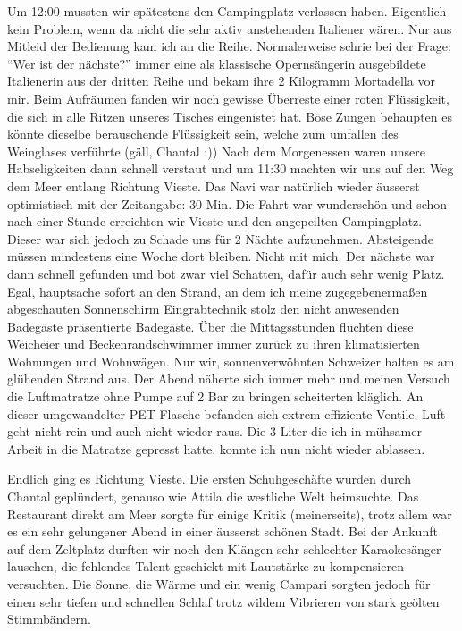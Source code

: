 Um 12:00 mussten wir spätestens den Campingplatz verlassen haben.
Eigentlich kein Problem, wenn da nicht die sehr aktiv anstehenden Italiener wären.
Nur aus Mitleid der Bedienung kam ich an die Reihe.
Normalerweise schrie bei der Frage: "`Wer ist der nächste?"' immer eine als klassische Opernsängerin ausgebildete Italienerin aus der dritten Reihe und bekam ihre 2 Kilogramm Mortadella vor mir.
Beim Aufräumen fanden wir noch gewisse Überreste einer roten Flüssigkeit, die sich in alle Ritzen unseres Tisches eingenistet hat.
Böse Zungen behaupten es könnte dieselbe berauschende Flüssigkeit sein, welche zum umfallen des Weinglases verführte (gäll, Chantal :)) Nach dem Morgenessen waren unsere Habseligkeiten dann schnell verstaut und um 11:30 machten wir uns auf den Weg dem Meer entlang Richtung Vieste.
Das Navi war natürlich wieder äusserst optimistisch mit der Zeitangabe: 30 Min.
Die Fahrt war wunderschön und schon nach einer Stunde erreichten wir Vieste und den angepeilten Campingplatz.
Dieser war sich jedoch zu Schade uns für 2 Nächte aufzunehmen.
Absteigende müssen mindestens eine Woche dort bleiben.
Nicht mit mich.
Der nächste war dann schnell gefunden und bot zwar viel Schatten, dafür auch sehr wenig Platz.
Egal, hauptsache sofort an den Strand, an dem ich meine zugegebenermaßen abgeschauten Sonnenschirm Eingrabtechnik stolz den nicht anwesenden Badegäste präsentierte Badegäste.
Über die Mittagsstunden flüchten diese Weicheier und Beckenrandschwimmer immer zurück zu ihren klimatisierten Wohnungen und Wohnwägen.
Nur wir, sonnenverwöhnten Schweizer halten es am glühenden Strand aus.
Der Abend näherte sich immer mehr und meinen Versuch die Luftmatratze ohne Pumpe auf 2 Bar zu bringen scheiterten kläglich.
An dieser umgewandelter PET Flasche befanden sich extrem effiziente Ventile.
Luft geht nicht rein und auch nicht wieder raus.
Die 3 Liter die ich in mühsamer Arbeit in die Matratze gepresst hatte, konnte ich nun nicht wieder ablassen.

Endlich ging es Richtung Vieste.
Die ersten Schuhgeschäfte wurden durch Chantal geplündert, genauso wie Attila die westliche Welt heimsuchte.
Das Restaurant direkt am Meer sorgte für einige Kritik (meinerseits), trotz allem war es ein sehr gelungener Abend in einer äusserst schönen Stadt.
Bei der Ankunft auf dem Zeltplatz durften wir noch den Klängen sehr schlechter Karaokesänger lauschen, die fehlendes Talent geschickt mit Lautstärke zu kompensieren versuchten.
Die Sonne, die Wärme und ein wenig Campari sorgten jedoch für einen sehr tiefen und schnellen Schlaf trotz wildem Vibrieren von stark geölten Stimmbändern.

